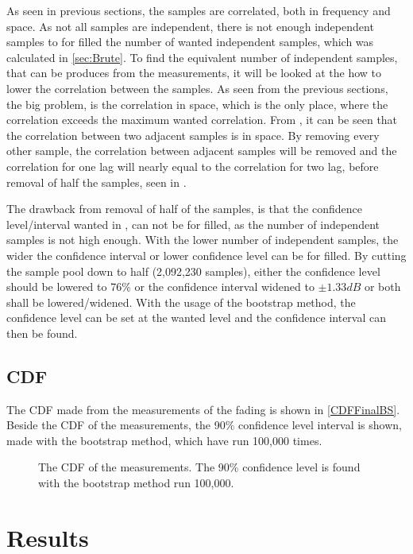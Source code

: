 As seen in previous sections, the samples are correlated, both in frequency and space. As not all samples are independent, there is not enough independent samples to for filled the number of wanted independent samples, which was calculated in \autoref{sec:Brute}. To find the equivalent number of independent samples, that can be produces from the measurements, it will be looked at the how to lower the correlation between the samples. As seen from the previous sections, the big problem, is the correlation in space, which is the only place, where the correlation exceeds the maximum wanted correlation. From , it can be seen that the correlation between two adjacent samples is  in space. By removing every other sample, the correlation between adjacent samples will be removed and the correlation for one lag will nearly equal to the correlation for two lag, before removal of half the samples, seen in .


The drawback from removal of half of the samples, is that the confidence level/interval wanted in , can not be for filled, as the number of independent samples is not high enough. With the lower number of independent samples, the wider the confidence interval or lower confidence level can be for filled. By cutting the sample pool down to half (2,092,230 samples), either the confidence level should be lowered to 76\% or the confidence interval widened to $\pm 1.33dB$ or both shall be lowered/widened. With the usage of the bootstrap method, the confidence level can be set at the wanted level and the confidence interval can then be found.


\subsection{CDF}
The CDF made from the measurements of the fading is shown in \autoref{CDFFinalBS}. Beside the CDF of the measurements, the 90\% confidence level interval is shown, made with the bootstrap method, which have run 100,000 times.


\begin{figure}[H]

\caption{The CDF of the measurements. The 90\% confidence level is found with the bootstrap method run 100,000.}
\label{CDFFinalBS}
\end{figure}


\section{Results}